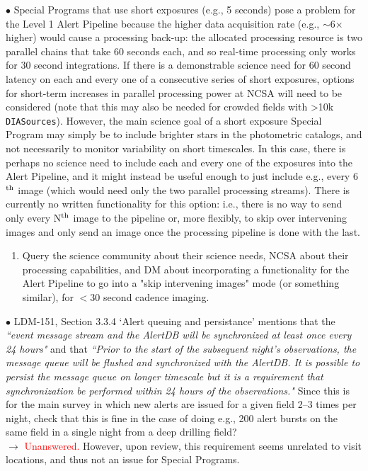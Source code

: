 \documentclass[DM,lsstdraft,toc]{lsstdoc}
\begin{document}
$\bullet$ Special Programs that use short exposures (e.g., 5 seconds) pose a problem for the Level 1 Alert Pipeline because the higher data acquisition rate (e.g., $\sim$6$\times$ higher) would cause a processing back-up: the allocated processing resource is two parallel chains that take 60 seconds each, and so real-time processing only works for 30 second integrations. If there is a demonstrable science need for 60 second latency on each and every one of a consecutive series of short exposures, options for short-term increases in parallel processing power at NCSA will need to be considered (note that this may also be needed for crowded fields with >10k {\tt DIASources}). However, the main science goal of a short exposure Special Program may simply be to include brighter stars in the photometric catalogs, and not necessarily to monitor variability on short timescales. In this case, there is perhaps no science need to include each and every one of the exposures into the Alert Pipeline, and it might instead be useful enough to just include e.g., every 6$^{\rm th}$ image (which would need only the two parallel processing streams). There is currently no written functionality for this option: i.e., there is no way to send only every N$^{\rm th}$ image to the pipeline or, more flexibly, to skip over intervening images and only send an image once the processing pipeline is done with the last. \\
\begin{enumerate}[resume,topsep=-10pt,label= \textbf{Concern \Roman*.}] \item \label{C7} Query the science community about their science needs, NCSA about their processing capabilities, and DM about incorporating a functionality for the Alert Pipeline to go into a "skip intervening images" mode (or something similar), for $<30$ second cadence imaging. \end{enumerate}

$\bullet$ LDM-151, Section 3.3.4 `Alert queuing and persistance' mentions that the {\it ``event message stream and the AlertDB will be synchronized at least once every 24 hours"} and that {\it ``Prior to the start of the subsequent night's observations, the message queue will be flushed and synchronized with the AlertDB. It is possible to persist the message queue on longer timescale but it is a requirement that synchronization be performed within 24 hours of the observations."} Since this is for the main survey in which new alerts are issued for a given field 2--3 times per night, check that this is fine in the case of doing e.g., 200 alert bursts on the same field in a single night from a deep drilling field? \\
$\rightarrow$  \textcolor{red}{Unanswered.} However, upon review, this requirement seems unrelated to visit locations, and thus not an issue for Special Programs.
\end{document}
